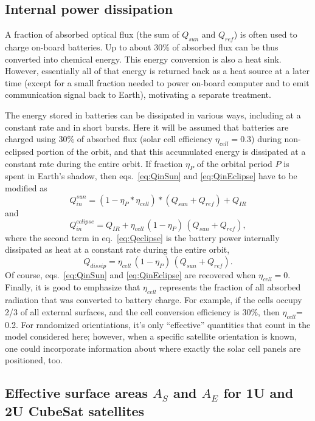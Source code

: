 \documentclass[]{aastex62}
\def\eq#1{\begin{equation} #1 \end{equation}}
\begin{document}
\subsection{Internal power dissipation \label{sec:batteries}} 

A fraction of absorbed optical flux (the sum of $Q_{sun}$ and $Q_{ref}$) is often used to charge 
on-board batteries. Up to about 30\% of absorbed flux can be thus converted into chemical energy.
This energy conversion is also a heat sink. However, essentially all of that energy is returned back 
as a heat source at a later time (except for a small fraction needed to power on-board computer and
to emit communication signal back to Earth), motivating a separate treatment.  

The energy stored in batteries can be dissipated in various ways, including at a constant rate and 
in short bursts. Here it will be assumed that batteries are charged using 30\% of absorbed flux 
(solar cell efficiency $\eta_{cell} = 0.3$) during non-eclipsed portion of the orbit, and that this 
accumulated energy is dissipated at a constant rate during the entire orbit. If fraction $\eta_P$ 
of the orbital period $P$ is spent in Earth's shadow, then eqs.~\ref{eq:QinSun} and \ref{eq:QinEclipse} 
have to be modified as 
\eq{
                  Q_{in}^{sun}  = (1 - \eta_P  * \eta_{cell}) * (Q_{sun} + Q_{ref}) + Q_{IR}    
} 
and 
\eq{
\label{eq:Qeclipse}
                   Q_{in}^{eclipse}  = Q_{IR} +  \eta_{cell} \, (1 - \eta_P) \, (Q_{sun} + Q_{ref}), 
} 
where the second term in eq.~\ref{eq:Qeclipse} is the battery power internally dissipated as heat
at a constant rate during the entire orbit,
\eq{
                   Q_{dissip}  =  \eta_{cell} \, (1 - \eta_P) \, (Q_{sun} + Q_{ref}).
} 
Of course, eqs.~\ref{eq:QinSun} and \ref{eq:QinEclipse} are recovered when $\eta_{cell} = 0$. Finally,
it is good to emphasize that $\eta_{cell}$ represents the fraction of all absorbed radiation that
was converted to battery charge. For example, if the cells occupy 2/3 of all external surfaces, and 
the cell conversion efficiency is 30\%, then $\eta_{cell}$= 0.2. For randomized orientiations, it's only
``effective'' quantities that count in the model considered here; however, when a specific satellite orientation
is known, one could incorporate information about where exactly the solar cell panels are positioned, too.  


\subsection{Effective surface areas $A_S$ and $A_E$  for 1U and 2U CubeSat satellites \label{sec:effA}} 
\end{document}

